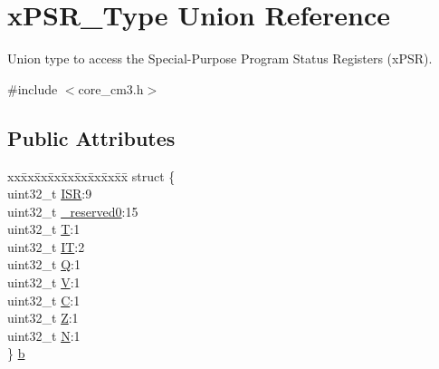 \hypertarget{unionx_p_s_r___type}{\section{x\-P\-S\-R\-\_\-\-Type Union Reference}
\label{unionx_p_s_r___type}
}


Union type to access the Special-\/\-Purpose Program Status Registers (x\-P\-S\-R).  




{\ttfamily \#include $<$core\-\_\-cm3.\-h$>$}

\subsection*{Public Attributes}
\begin{DoxyCompactItemize}
\item 
\begin{tabbing}
xx\=xx\=xx\=xx\=xx\=xx\=xx\=xx\=xx\=\kill
struct \{\\
\>uint32\_t \hyperlink{unionx_p_s_r___type_a3e9120dcf1a829fc8d2302b4d0673970}{ISR}:9\\
\>uint32\_t \hyperlink{unionx_p_s_r___type_af438e0f407357e914a70b5bd4d6a97c5}{\_reserved0}:15\\
\>uint32\_t \hyperlink{unionx_p_s_r___type_a7eed9fe24ae8d354cd76ae1c1110a658}{T}:1\\
\>uint32\_t \hyperlink{unionx_p_s_r___type_a3200966922a194d84425e2807a7f1328}{IT}:2\\
\>uint32\_t \hyperlink{unionx_p_s_r___type_add7cbd2b0abd8954d62cd7831796ac7c}{Q}:1\\
\>uint32\_t \hyperlink{unionx_p_s_r___type_af14df16ea0690070c45b95f2116b7a0a}{V}:1\\
\>uint32\_t \hyperlink{unionx_p_s_r___type_a40213a6b5620410cac83b0d89564609d}{C}:1\\
\>uint32\_t \hyperlink{unionx_p_s_r___type_a1e5d9801013d5146f2e02d9b7b3da562}{Z}:1\\
\>uint32\_t \hyperlink{unionx_p_s_r___type_a2db9a52f6d42809627d1a7a607c5dbc5}{N}:1\\
\} \hyperlink{unionx_p_s_r___type_ad60a0ab87ad28af113330426e90caee3}{b}\\


\end{tabbing}
\end{DoxyCompactItemize}
